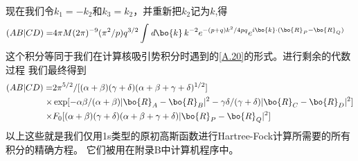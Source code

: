 现在我们令$k_1=-k_2$和$k_3=k_2$，并重新把$k_2$记为$k$,得
\begin{align}
	\label{A.40}
	(AB|CD)=&4\pi M(2\pi)^{-9}(\pi^2/p)q^{3/2}\int\emph{d}\bo{k}\,
	k^{-2}e^{-(p+q)k^2/4pq}e^{i\bo{k}\cdot(\bo{R}_P-\bo{R}_Q)}
\end{align}
这个积分等同于我们在计算核吸引势积分时遇到的\autoref{A.20}的形式。进行剩余的代数过程
我们最终得到
\begin{align}
	\label{A.41}
	(AB|CD)=&2\pi ^{5/2}/[(\alpha+\beta)(\gamma+\delta)(\alpha+\beta+\gamma+\delta)^{1/2}]
	\nonumber\\
	\times&\exp[-\alpha\beta/(\alpha+\beta)|\bo{R}_A-\bo{R}_B|^2-\gamma\delta/(\gamma+\delta)|\bo{R}_C-\bo{R}_D|^2]
	\nonumber\\
	\times&F_0[(\alpha+\beta)(\gamma+\delta)(\alpha+\beta+\gamma+\delta)|\bo{R}_P-\bo{R}_Q|^2]
\end{align}
以上这些就是我们仅用1s类型的原初高斯函数进行Hartree-Fock计算所需要的所有积分的精确方程。
它们被用在附录B中计算机程序中。

\newpage
\theendnotes
{}
